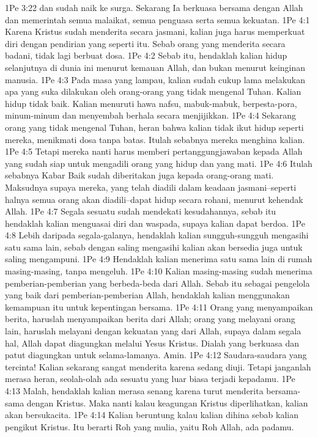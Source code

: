 1Pe 3:22  dan sudah naik ke surga. Sekarang Ia berkuasa bersama dengan Allah dan memerintah semua malaikat, semua penguasa serta semua kekuatan.
1Pe 4:1  Karena Kristus sudah menderita secara jasmani, kalian juga harus memperkuat diri dengan pendirian yang seperti itu. Sebab orang yang menderita secara badani, tidak lagi berbuat dosa.
1Pe 4:2  Sebab itu, hendaklah kalian hidup selanjutnya di dunia ini menurut kemauan Allah, dan bukan menurut keinginan manusia.
1Pe 4:3  Pada masa yang lampau, kalian sudah cukup lama melakukan apa yang suka dilakukan oleh orang-orang yang tidak mengenal Tuhan. Kalian hidup tidak baik. Kalian menuruti hawa nafsu, mabuk-mabuk, berpesta-pora, minum-minum dan menyembah berhala secara menjijikkan.
1Pe 4:4  Sekarang orang yang tidak mengenal Tuhan, heran bahwa kalian tidak ikut hidup seperti mereka, menikmati dosa tanpa batas. Itulah sebabnya mereka menghina kalian.
1Pe 4:5  Tetapi mereka nanti harus memberi pertanggungjawaban kepada Allah yang sudah siap untuk mengadili orang yang hidup dan yang mati.
1Pe 4:6  Itulah sebabnya Kabar Baik sudah diberitakan juga kepada orang-orang mati. Maksudnya supaya mereka, yang telah diadili dalam keadaan jasmani--seperti halnya semua orang akan diadili--dapat hidup secara rohani, menurut kehendak Allah.
1Pe 4:7  Segala sesuatu sudah mendekati kesudahannya, sebab itu hendaklah kalian menguasai diri dan waspada, supaya kalian dapat berdoa.
1Pe 4:8  Lebih daripada segala-galanya, hendaklah kalian sungguh-sungguh mengasihi satu sama lain, sebab dengan saling mengasihi kalian akan bersedia juga untuk saling mengampuni.
1Pe 4:9  Hendaklah kalian menerima satu sama lain di rumah masing-masing, tanpa mengeluh.
1Pe 4:10  Kalian masing-masing sudah menerima pemberian-pemberian yang berbeda-beda dari Allah. Sebab itu sebagai pengelola yang baik dari pemberian-pemberian Allah, hendaklah kalian menggunakan kemampuan itu untuk kepentingan bersama.
1Pe 4:11  Orang yang menyampaikan berita, haruslah menyampaikan berita dari Allah; orang yang melayani orang lain, haruslah melayani dengan kekuatan yang dari Allah, supaya dalam segala hal, Allah dapat diagungkan melalui Yesus Kristus. Dialah yang berkuasa dan patut diagungkan untuk selama-lamanya. Amin.
1Pe 4:12  Saudara-saudara yang tercinta! Kalian sekarang sangat menderita karena sedang diuji. Tetapi janganlah merasa heran, seolah-olah ada sesuatu yang luar biasa terjadi kepadamu.
1Pe 4:13  Malah, hendaklah kalian merasa senang karena turut menderita bersama-sama dengan Kristus. Maka nanti kalau keagungan Kristus diperlihatkan, kalian akan bersukacita.
1Pe 4:14  Kalian beruntung kalau kalian dihina sebab kalian pengikut Kristus. Itu berarti Roh yang mulia, yaitu Roh Allah, ada padamu.
